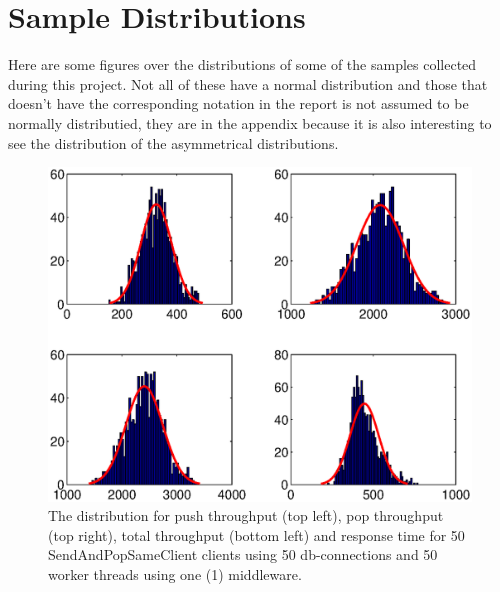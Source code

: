 \documentclass{article}
\begin{document}
        \section{Sample Distributions}
        Here are some figures over the distributions of some of the samples collected during this project. Not all of these have a normal distribution and those that doesn't have the corresponding notation in the report is not assumed to be normally distributied, they are  in the appendix because it is also interesting to see the distribution of the asymmetrical distributions.
        \begin{figure}[hbtp]
        \centering
        \centerline{\includegraphics[scale=0.5]{img/histfit_1middleware_push_rop_total_resptime.eps}}
        \caption{The distribution for push throughput (top left), pop throughput (top right), total throughput (bottom left) and response time for 50 SendAndPopSameClient clients using 50 db-connections and 50 worker threads using one (1) middleware.}
        \end{figure}
        
\end{document}
